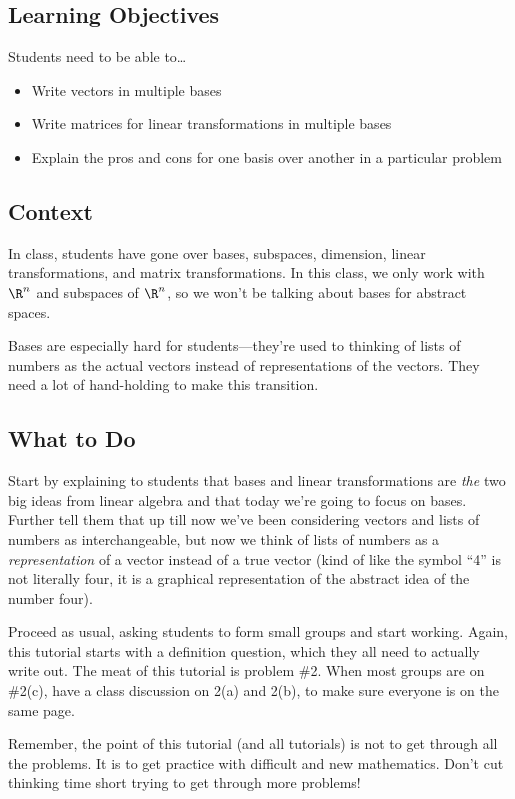 \subsection*{Learning Objectives}
	Students need to be able to\ldots
	\begin{itemize}
		\item Write vectors in multiple bases
		\item Write matrices for linear transformations in multiple bases
		\item Explain the pros and cons for one basis over another in a particular problem
	\end{itemize}

\subsection*{Context}
	In class, students have gone over bases, subspaces, dimension, linear transformations, and
		matrix transformations. In this class, we only work with $\R^n$ and subspaces of $\R^n$,
		so we won't be talking about bases for abstract spaces.
	
	Bases are especially hard for students---they're used to thinking of lists of numbers
		as the actual vectors instead of representations of the vectors. They need
		a lot of hand-holding to make this transition.

\subsection*{What to Do}
	Start by explaining to students that bases and linear transformations are \emph{the}
		two big ideas from linear algebra and that today we're going to focus on bases.
		Further tell them that up till now we've been considering vectors and lists
		of numbers as interchangeable, but now we think of lists of numbers
		as a \emph{representation} of a vector instead of a true vector (kind of like
		the symbol ``4'' is not literally four, it is a graphical representation of
		the abstract idea of the number four).
	
	Proceed as usual, asking students to form small groups and start working.
		Again, this tutorial starts with a definition question, which they all need to actually write out.
		The meat of this tutorial is problem \#2.
		When most groups are on \#2(c), have a class discussion on 2(a) and 2(b), to
		make sure everyone is on the same page.


	Remember, the point of this tutorial (and all tutorials) is not to get through all the problems.
	It is to get practice with difficult and new mathematics. Don't cut thinking time short trying
	to get through more problems!

